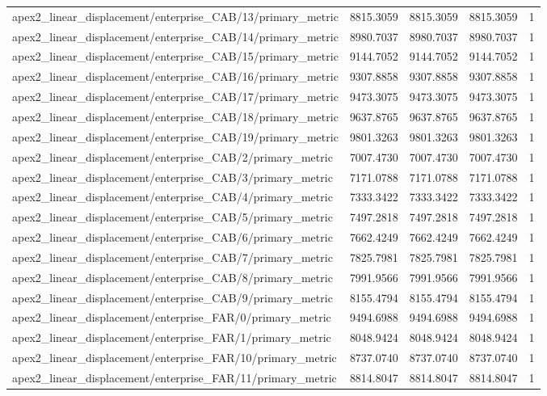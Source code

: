 \begin{table}[h]
\begin{tabular}{lrrrr}
apex2_linear_displacement/enterprise_CAB/13/primary_metric & 8815.3059 & 8815.3059 & 8815.3059 & 1 \\
apex2_linear_displacement/enterprise_CAB/14/primary_metric & 8980.7037 & 8980.7037 & 8980.7037 & 1 \\
apex2_linear_displacement/enterprise_CAB/15/primary_metric & 9144.7052 & 9144.7052 & 9144.7052 & 1 \\
apex2_linear_displacement/enterprise_CAB/16/primary_metric & 9307.8858 & 9307.8858 & 9307.8858 & 1 \\
apex2_linear_displacement/enterprise_CAB/17/primary_metric & 9473.3075 & 9473.3075 & 9473.3075 & 1 \\
apex2_linear_displacement/enterprise_CAB/18/primary_metric & 9637.8765 & 9637.8765 & 9637.8765 & 1 \\
apex2_linear_displacement/enterprise_CAB/19/primary_metric & 9801.3263 & 9801.3263 & 9801.3263 & 1 \\
apex2_linear_displacement/enterprise_CAB/2/primary_metric & 7007.4730 & 7007.4730 & 7007.4730 & 1 \\
apex2_linear_displacement/enterprise_CAB/3/primary_metric & 7171.0788 & 7171.0788 & 7171.0788 & 1 \\
apex2_linear_displacement/enterprise_CAB/4/primary_metric & 7333.3422 & 7333.3422 & 7333.3422 & 1 \\
apex2_linear_displacement/enterprise_CAB/5/primary_metric & 7497.2818 & 7497.2818 & 7497.2818 & 1 \\
apex2_linear_displacement/enterprise_CAB/6/primary_metric & 7662.4249 & 7662.4249 & 7662.4249 & 1 \\
apex2_linear_displacement/enterprise_CAB/7/primary_metric & 7825.7981 & 7825.7981 & 7825.7981 & 1 \\
apex2_linear_displacement/enterprise_CAB/8/primary_metric & 7991.9566 & 7991.9566 & 7991.9566 & 1 \\
apex2_linear_displacement/enterprise_CAB/9/primary_metric & 8155.4794 & 8155.4794 & 8155.4794 & 1 \\
apex2_linear_displacement/enterprise_FAR/0/primary_metric & 9494.6988 & 9494.6988 & 9494.6988 & 1 \\
apex2_linear_displacement/enterprise_FAR/1/primary_metric & 8048.9424 & 8048.9424 & 8048.9424 & 1 \\
apex2_linear_displacement/enterprise_FAR/10/primary_metric & 8737.0740 & 8737.0740 & 8737.0740 & 1 \\
apex2_linear_displacement/enterprise_FAR/11/primary_metric & 8814.8047 & 8814.8047 & 8814.8047 & 1 \\

\end{tabular}
\end{table}
